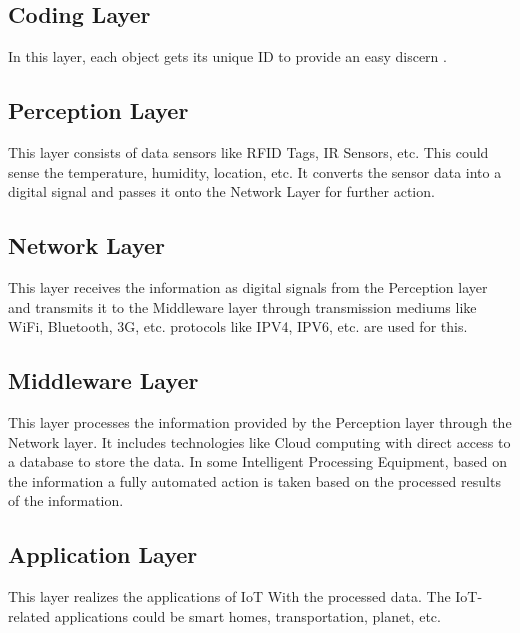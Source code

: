 \documentclass[twoside,twocolumn]{article}
\begin{document}
    \subsection{Coding Layer}
        \noindent In this layer, each object gets its unique ID to provide an easy discern \cite{ArchitectureIoT}.        
    \subsection{Perception Layer}
        \noindent This layer consists of data sensors like RFID Tags, IR Sensors, etc. This could sense the temperature, humidity, location, etc. It converts the sensor data into a digital signal and passes it onto the Network Layer for further action.
    \subsection{Network Layer}
        \noindent This layer receives the information as digital signals from the Perception layer and transmits it to the Middleware layer through transmission mediums like WiFi, Bluetooth, 3G, etc. protocols like IPV4, IPV6, etc. are used for this.
    \subsection{Middleware Layer}
        \noindent This layer processes the information provided by the Perception layer through the Network layer. It includes technologies like Cloud computing with direct access to a database to store the data. In some Intelligent Processing Equipment, based on the information a fully automated action is taken based on the processed results of the information.
    \subsection{Application Layer}
        \noindent This layer realizes the applications of IoT With the processed data. The IoT-related applications could be smart homes, transportation, planet, etc.
\end{document}
